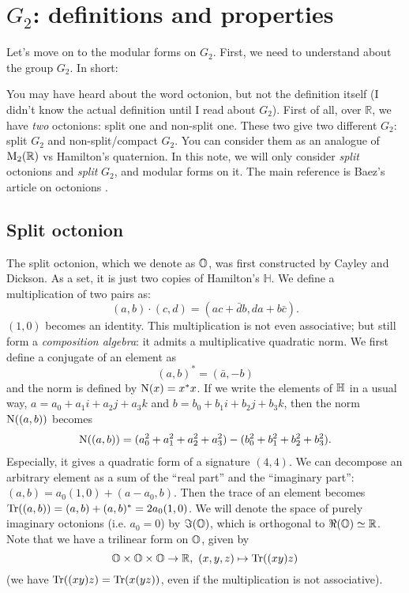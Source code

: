 \section{$G_2$: definitions and properties}
\label{sec:g2def}

Let's move on to the modular forms on $G_2$.
First, we need to understand about the group $G_2$.
In short:
\begin{center}
\end{center}
You may have heard about the word octonion, but not the definition itself (I didn't know the actual definition until I read about $G_2$).
First of all, over $\mathbb{R}$, we have \emph{two} octonions: split one and non-split one.
These two give two different $G_2$: split $G_2$ and non-split/compact $G_2$.
You can consider them as an analogue of $\mathrm{M}_2(\mathbb{R})$ vs Hamilton's quaternion.
In this note, we will only consider \emph{split} octonions and \emph{split} $G_2$, and modular forms on it.
The main reference is Baez's article on octonions \cite{baez2002octonions}.

\subsection{Split octonion}

The split octonion, which we denote as $\mathbb{O}$, was first constructed by Cayley and Dickson.
As a set, it is just two copies of Hamilton's $\mathbb{H}$.
We define a multiplication of two pairs as:
$$
(a, b) \cdot (c, d) = (ac + \bar{d}b, da + b\bar{c}).
$$
$(1, 0)$ becomes an identity.
This multiplication is not even associative; but still form a \emph{composition algebra}: it admits a multiplicative quadratic norm.
We first define a conjugate of an element as
$$
(a, b)^\ast = (\bar{a}, -b)
$$
and the norm is defined by $\mathrm{N}(x) = x^\ast x$.
If we write the elements of $\mathbb{H}$ in a usual way, $a = a_0 + a_1 i + a_2 j + a_3 k$ and $b = b_0 + b_1 i + b_2 j + b_3 k$, then the norm $\mathrm{N}((a, b))$ becomes
\begin{align*}
    \mathrm{N}((a, b)) = (a_0^2 + a_1^2 + a_2^2 + a_3^2) - (b_0^2 + b_1^2 + b_2^2 + b_3^2).
\end{align*}
Especially, it gives a quadratic form of a signature $(4, 4)$.
We can decompose an arbitrary element as a sum of the ``real part'' and the ``imaginary part'': $(a, b) = a_0(1, 0) + (a - a_0, b)$.
Then the trace of an element becomes $\mathrm{Tr}((a, b)) = (a, b) + (a, b)^\ast = 2a_0 (1, 0)$.
We will denote the space of purely imaginary octonions (i.e. $a_0 = 0$) by $\Im(\mathbb{O})$, which is orthogonal to $\Re(\mathbb{O}) \simeq \mathbb{R}$.
Note that we have a trilinear form on $\mathbb{O}$, given by
$$
\mathbb{O} \times \mathbb{O} \times \mathbb{O} \to \mathbb{R}, \,\, (x, y, z) \mapsto \mathrm{Tr}((xy)z)
$$
(we have $\mathrm{Tr}((xy)z) = \mathrm{Tr}(x(yz))$, even if the multiplication is not associative).

